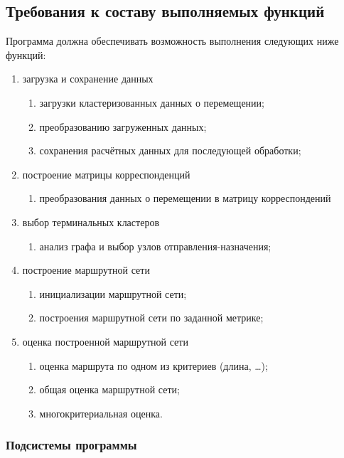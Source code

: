 \subsection{Требования к составу выполняемых функций}
Программа должна обеспечивать возможность выполнения следующих ниже функций:
\begin{enumerate}
    \item загрузка и сохранение данных
    \begin{enumerate}
        \item загрузки кластеризованных данных о перемещении;
        \item преобразованию загруженных данных;
        \item сохранения расчётных данных для последующей обработки;
    \end{enumerate}
    \item построение матрицы корреспонденций
    \begin{enumerate}
        \item преобразования данных о перемещении в матрицу корреспондений
    \end{enumerate}
    \item выбор терминальных кластеров
    \begin{enumerate}
        \item анализ графа и выбор узлов отправления-назначения;
    \end{enumerate}
    \item построение маршрутной сети
    \begin{enumerate}
        \item инициализации маршрутной сети;
        \item построения маршрутной сети по заданной метрике;
    \end{enumerate}
    \item оценка построенной маршрутной сети
    \begin{enumerate}
        \item оценка маршрута по одном из критериев (длина, \ldots);
        \item общая оценка маршрутной сети;
        \item многокритериальная оценка.
    \end{enumerate}
\end{enumerate}

\subsubsection{Подсистемы программы}

